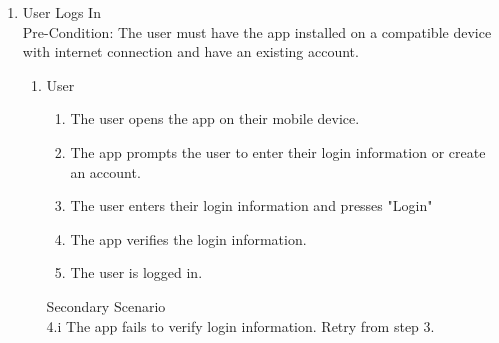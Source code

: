 \documentclass[]{article}
\begin{document}
\begin{enumerate}[{\bf BE1.}]
\begin{enumerate}[{\bf VP1.}]
        \item Experts\\
        NA
        \item Finance \\
        NA
        \item Advertisers\\
        NA \\
    \end{enumerate}
        {\bf Global Scenario:}\\
        Pre-Condition: The user must have the app installed on a compatible device with internet connection and not have an existing account.
        \begin{enumerate}[{1.}]
            \item The user opens the app on their mobile device. 
            \item The app prompts the user to enter their login information or create an account. 
            \item The user selects the option to create an account. 
            \item The app prompts the user with the necessary fields to fill in for registration. 
            \item The user enters relevant details.
            \item The user presses "Register". 
            \item The app verifies registration information. \\ 7.i. System fails to verify registration information. On failure, system prompts user with the option to contact customer support before retrying. Retry from step 4. 
            \item The user is registered and logged in. 
        \end{enumerate}

    \item User Logs In \\
    Pre-Condition: The user must have the app installed on a compatible device with internet connection and have an existing account.
    \begin{enumerate}[{\bf VP1. }]
        \item User
        \begin{enumerate}[{1. }]
            \item The user opens the app on their mobile device. 
            \item The app prompts the user to enter their login information or create an account.
            \item The user enters their login information and presses "Login"
            \item The app verifies the login information.
            \item The user is logged in. 
        \end{enumerate}
        Secondary Scenario \\
        4.i The app fails to verify login information. Retry from step 3. 
        

\end{enumerate}
\end{enumerate}
\end{document}
